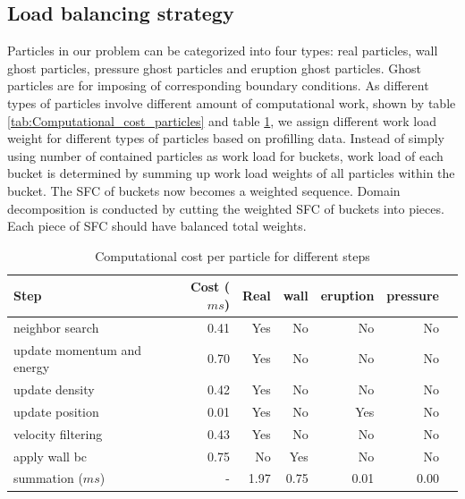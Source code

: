 \documentclass[procedia]{easychair}
\begin{document}
\subsection{Load balancing strategy}
\label{sect:load_balance}
Particles in our problem can be categorized into four types: real particles, wall ghost particles, pressure ghost particles and eruption ghost particles. Ghost particles are for imposing of corresponding boundary conditions. As different types of particles involve different amount of computational work, shown by table \ref{tab:Computational_cost_particles} and table \ref{tab:Computational_cost_steps}, we assign different work load weight for different types of particles based on profilling data. Instead of simply using number of contained particles as work load for buckets, work load of each bucket is determined by summing up work load weights of all particles within the bucket. The SFC of buckets now becomes a weighted sequence. Domain decomposition  is conducted by cutting the weighted SFC of buckets into pieces. Each piece of SFC should have balanced total weights.
\begin{table}[htp]
	\begin{centering}
	\caption{Computational cost per particle for different steps}		
	  \begin{tabular}{lrrrrrr}
	    \hline
	    Step & Cost ($ms$) & Real & wall & eruption & pressure\\
	    \hline
	    neighbor search & 0.41 & Yes & No & No & No \\
	    update momentum and energy & 0.70 & Yes & No & No & No\\
	    update density & 0.42 & Yes & No & No & No \\
	    update position & 0.01 & Yes & No & Yes &  No\\
	    velocity filtering& 0.43 & Yes & No & No & No\\
	    apply wall bc     & 0.75 & No & Yes & No & No\\
	    summation ($ms$) & - & 1.97 & 0.75 & 0.01 & 0.00\\
	    \hline
	  \end{tabular}
	  \label{tab:Computational_cost_steps}	
	\end{centering}
\end{table}
%
\end{document}
